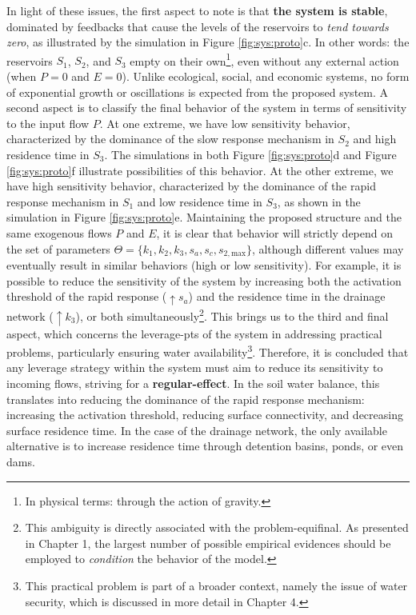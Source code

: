 \documentclass[./main_en.tex]{subfiles}
\begin{document}
\par In light of these issues, the first aspect to note is that \textbf{the \gls{system} is stable}, dominated by feedbacks that cause the levels of the reservoirs to \textit{tend towards zero}, as illustrated by the simulation in Figure \ref{fig:sys:proto}c. In other words: the reservoirs $S_1$, $S_2$, and $S_3$ empty on their own\footnote{In physical terms: through the action of gravity.}, even without any external action (when $P=0$ and $E=0$). Unlike ecological, social, and economic systems, no form of exponential growth or oscillations is expected from the proposed \gls{system}. A second aspect is to classify the final behavior of the \gls{system} in terms of sensitivity to the input flow $P$. At one extreme, we have low sensitivity behavior, characterized by the dominance of the slow response mechanism in $S_2$ and high residence time in $S_3$. The simulations in both Figure \ref{fig:sys:proto}d and Figure \ref{fig:sys:proto}f illustrate possibilities of this behavior. At the other extreme, we have high sensitivity behavior, characterized by the dominance of the rapid response mechanism in $S_1$ and low residence time in $S_3$, as shown in the simulation in Figure \ref{fig:sys:proto}e. Maintaining the proposed structure and the same exogenous flows $P$ and $E$, it is clear that behavior will strictly depend on the set of \gls{parameters} $\Theta = \{k_1, k_2, k_3, s_a, s_c, s_{2, \text{max}}\}$, although different values may eventually result in similar behaviors (high or low sensitivity). For example, it is possible to reduce the sensitivity of the \gls{system} by increasing both the activation threshold of the rapid response ($ \uparrow s_a$) and the residence time in the drainage network ($ \uparrow k_3$), or both simultaneously\footnote{This ambiguity is directly associated with the \gls{problem-equifinal}. As presented in Chapter 1, the largest number of possible empirical evidences should be employed to \textit{condition} the behavior of the \gls{model}.}. This brings us to the third and final aspect, which concerns the \gls{leverage-pts} of the \gls{system} in addressing practical problems, particularly ensuring water availability\footnote{This practical problem is part of a broader context, namely the issue of water security, which is discussed in more detail in Chapter 4.}. Therefore, it is concluded that any leverage strategy within the \gls{system} must aim to reduce its sensitivity to incoming flows, striving for a \textbf{\gls{regular-effect}}. In the soil water balance, this translates into reducing the dominance of the rapid response mechanism: increasing the activation threshold, reducing surface connectivity, and decreasing surface residence time. In the case of the drainage network, the only available alternative is to increase residence time through detention basins, ponds, or even dams.
\end{document}
